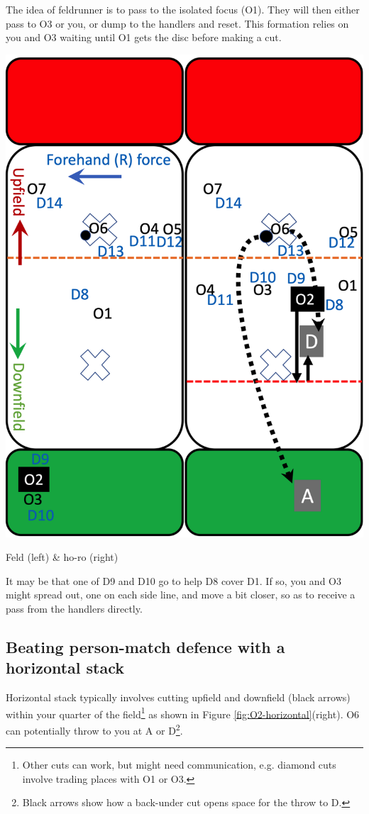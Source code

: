 \documentclass{tufte-handout}
\begin{document}
The idea of feldrunner 
is to pass to 
the isolated
focus (O1). 
They will then either pass to 
O3 or you, 
or dump to the handlers
and reset. This formation relies 
on you and O3 
waiting until O1 
gets the disc 
before making a cut.  
\begin{marginfigure}%
  \includegraphics[width=\linewidth]{O2-horizontal}
  \caption{Feld (left) \& ho-ro (right)}
  \label{fig:O2-horizontal}
\end{marginfigure}

It may be that 
one of 
D9 
and D10 
go to help D8 
cover D1.  
If so, 
you and O3 
might spread out, 
one on each side line,
and move a bit closer, 
so as to receive a pass from 
the handlers directly.  


\subsection{Beating person-match defence with a horizontal stack}\label{sec:horizontall}
Horizontal stack 
typically involves cutting
upfield and downfield (black arrows)
within your quarter of the field\footnote{
Other cuts
can work, 
but might need
communication,
e.g. diamond cuts 
involve trading places 
with O1 
or O3.}
as shown in 
Figure \ref{fig:O2-horizontal}(right).
O6 
can potentially 
throw to you 
at A 
or D\footnote{
Black arrows
show how a back-under cut 
opens space 
for the throw 
to D.}. 
\end{document}
